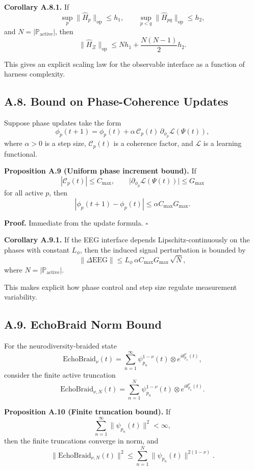 \documentclass[11pt]{article}
\begin{document}
\textbf{Corollary A.8.1.}
If
\[
\sup_p \|\hat{H}_p\|_{\mathrm{op}} \le h_1,
\qquad
\sup_{p<q}\|\hat{H}_{pq}\|_{\mathrm{op}} \le h_2,
\]
and $N=|\mathbb{P}_{\mathrm{active}}|$, then
\[
\|\hat{H}_\Xi\|_{\mathrm{op}}
\le
N h_1 + \frac{N(N-1)}{2} h_2.
\]

This gives an explicit scaling law for the observable interface as a function of harness complexity.

\subsection*{A.8. Bound on Phase-Coherence Updates}

Suppose phase updates take the form
\[
\phi_p(t+1)
=
\phi_p(t) + \alpha\, \mathcal{C}_p(t)\,\partial_{\phi_p}\mathcal{L}(\Psi(t)),
\]
where $\alpha>0$ is a step size, $\mathcal{C}_p(t)$ is a coherence factor, and $\mathcal{L}$ is a learning functional.

\textbf{Proposition A.9 (Uniform phase increment bound).}
If
\[
|\mathcal{C}_p(t)| \le C_{\max},
\qquad
\big|\partial_{\phi_p}\mathcal{L}(\Psi(t))\big| \le G_{\max}
\]
for all active $p$, then
\[
|\phi_p(t+1)-\phi_p(t)|
\le
\alpha C_{\max} G_{\max}.
\]

\textbf{Proof.}
Immediate from the update formula. \hfill $\square$

\textbf{Corollary A.9.1.}
If the EEG interface depends Lipschitz-continuously on the phases with constant $L_\phi$, then the induced signal perturbation is bounded by
\[
\|\Delta \mathrm{EEG}\|
\le
L_\phi \,\alpha C_{\max} G_{\max}\,\sqrt{N},
\]
where $N=|\mathbb{P}_{\mathrm{active}}|$.

This makes explicit how phase control and step size regulate measurement variability.

\subsection*{A.9. EchoBraid Norm Bound}

For the neurodiversity-braided state
\[
\mathrm{EchoBraid}_\nu(t)
=
\sum_{n=1}^{\infty}\psi_{p_n}^{1-\nu}(t)\otimes e^{i\theta_{p_n}^{\nu}(t)},
\]
consider the finite active truncation
\[
\mathrm{EchoBraid}_{\nu,N}(t)
=
\sum_{n=1}^{N}\psi_{p_n}^{1-\nu}(t)\otimes e^{i\theta_{p_n}^{\nu}(t)}.
\]

\textbf{Proposition A.10 (Finite truncation bound).}
If
\[
\sum_{n=1}^{\infty}\|\psi_{p_n}(t)\|^2 < \infty,
\]
then the finite truncations converge in norm, and
\[
\|\mathrm{EchoBraid}_{\nu,N}(t)\|^2
\le
\sum_{n=1}^N \|\psi_{p_n}(t)\|^{2(1-\nu)}.
\]
\end{document}
